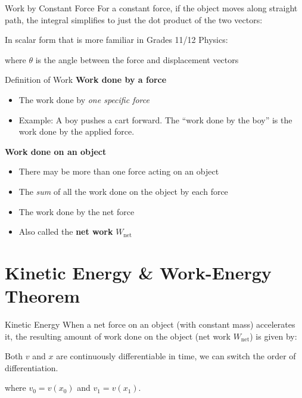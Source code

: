 \documentclass[12pt,compress,aspectratio=169]{beamer}
\begin{document}
\begin{frame}{Work by Constant Force}
  For a constant force, if the object moves along straight path, the integral
  simplifies to just the dot product of the two vectors:


  In scalar form that is more familiar in Grades 11/12 Physics:


  where $\theta$ is the angle between the force and displacement vectors
\end{frame}



\begin{frame}{Definition of Work}
  \textbf{Work done by a force}
  \begin{itemize}
  \item The work done by \emph{one specific force}
  \item Example: A boy pushes a cart forward. The ``work done by the boy'' is
    the work done by the applied force.
  \end{itemize}

  \vspace{.15in}\textbf{Work done on an object}
  \begin{itemize}
  \item There may be more than one force acting on an object
  \item The \emph{sum} of all the work done on the object by each force
  \item The work done by the net force
  \item Also called the \textbf{net work} $W_\text{net}$
  \end{itemize}
\end{frame}



\section{Kinetic Energy \& Work-Energy Theorem}

\begin{frame}{Kinetic Energy}
  When a net force on an object (with constant mass) accelerates it, the
  resulting amount of work done on the object (net work $W_\text{net}$) is
  given by:


  Both $v$ and $x$ are continuously differentiable in time, we can switch the
  order of differentiation.
  

  where $v_0=v(x_0)$ and $v_1=v(x_1)$.
\end{frame}
\end{document}
